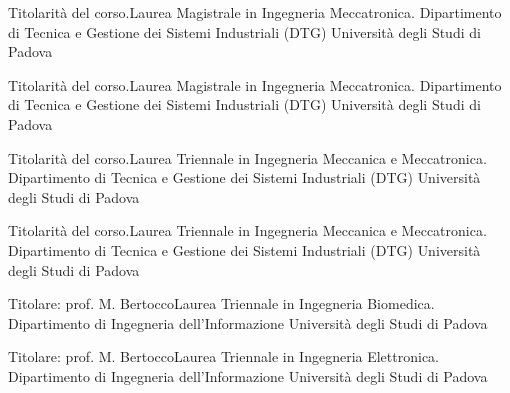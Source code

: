 {
{Titolarità del corso.\newline Laurea Magistrale in Ingegneria Meccatronica.\newline
Dipartimento di Tecnica e Gestione dei Sistemi Industriali (DTG)}
{Università degli Studi di Padova}{}{}

{Titolarità del corso.\newline Laurea Magistrale in Ingegneria Meccatronica.\newline
Dipartimento di Tecnica e Gestione dei Sistemi Industriali (DTG)}
{Università degli Studi di Padova}{}{}

{Titolarità del corso.\newline Laurea Triennale in Ingegneria Meccanica e Meccatronica.\newline
Dipartimento di Tecnica e Gestione dei Sistemi Industriali (DTG)}
{Università degli Studi di Padova}{}{}

{Titolarità del corso.\newline Laurea Triennale in Ingegneria Meccanica e Meccatronica.\newline
Dipartimento di Tecnica e Gestione dei Sistemi Industriali (DTG)}
{Università degli Studi di Padova}{}{}

{Titolare: prof. M. Bertocco\newline Laurea Triennale in Ingegneria Biomedica.\newline
Dipartimento di Ingegneria dell'Informazione}
{Università degli Studi di Padova}{}{}

{Titolare: prof. M. Bertocco\newline Laurea Triennale in Ingegneria Elettronica.\newline
Dipartimento di Ingegneria dell'Informazione}
{Università degli Studi di Padova}{}{}
}

